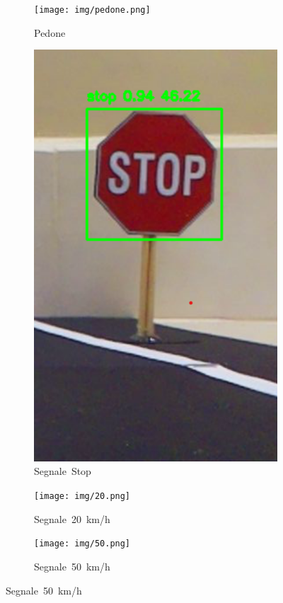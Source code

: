 \documentclass{article}
\begin{document}
\begin{figure}[h!]
    \centering
    \captionsetup[subfigure]{labelformat=parens,labelsep=space}
    \begin{subfigure}[b]{\textwidth}
        \centering
        \texttt{[image: img/pedone.png]}
        \caption{Pedone} 
        \label{fig:pedone}
    \end{subfigure}

    \vspace{0.8em} 

    \begin{subfigure}[b]{0.3\textwidth}
        \centering
        \includegraphics[width=\linewidth]{img/stop.png}
        \caption{Segnale Stop}
        \label{fig:stop}
    \end{subfigure}
    \hfill
    \begin{subfigure}[b]{0.3\textwidth}
        \centering
        \texttt{[image: img/20.png]}
        \caption{Segnale 20 km/h}
        \label{fig:20}
    \end{subfigure}
    \hfill
    \begin{subfigure}[b]{0.3\textwidth}
        \centering
        \texttt{[image: img/50.png]}
        \caption{Segnale 50 km/h} 
        \label{fig:50}
    \end{subfigure}


\end{figure}
\end{document}
